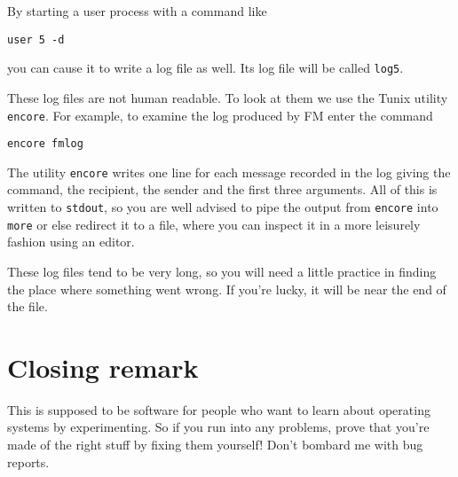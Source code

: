 By starting a user process with a command like
\begin{verbatim}
user 5 -d
\end{verbatim}
you can cause it to write a log file as well. Its
log file will be called {\tt log5}.


These log files are not human readable. To look at them
we use the Tunix utility {\tt encore}. For example,
to examine the log produced by FM enter the command
\begin{verbatim}
encore fmlog
\end{verbatim}
The utility {\tt encore} writes one line for each message
recorded in the log giving the command, the recipient,
the sender and the first three arguments. All of this
is written to {\tt stdout}, so you are well advised
to pipe the output from {\tt encore} into {\tt more}
or else redirect it to a file, where you can inspect
it in a more leisurely fashion using an editor.


These log files tend to be very long, so you will need
a little practice in finding the place where something
went wrong. If you're lucky, it will be near the end
of the file.


\section{Closing remark}
\noindent

This is supposed to be software for people who want to
learn about operating systems by experimenting. So if
you run into any problems, prove that you're made of the
right stuff by fixing them yourself! Don't bombard me
with bug reports.


 

